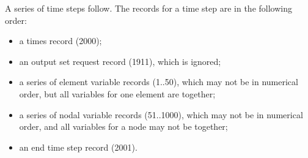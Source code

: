 A series of time steps follow. The records for a time step are in the
following order:
\setlength{\itemsep}{\medskipamount} \begin{itemize}
\item a times record (2000);
\item an output set request record (1911), which is ignored;
\item a series of element variable records (1..50), which may not be in
numerical order, but all variables for one element are together;
\item a series of nodal variable records (51..1000), which may not be in
numerical order, and all variables for a node may not be together;
\item an end time step record (2001).
\end{itemize}




